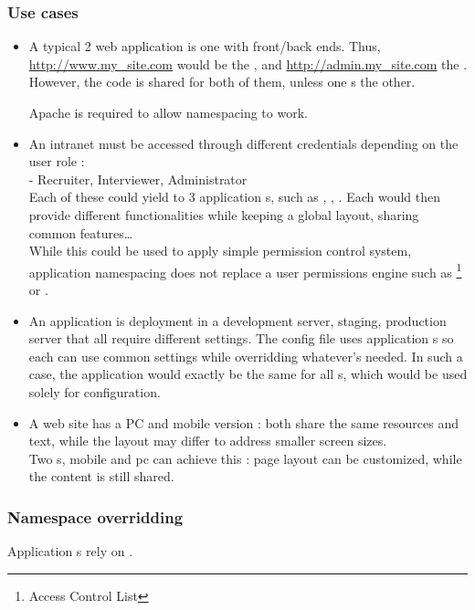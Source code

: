 \documentclass[pdftex,12pt,a4paper]{article}
\begin{document}
\subsubsection{Use cases}
    \begin{itemize}
        \item A typical 2  web application is one with front/back ends.
Thus, \url{http://www.my_site.com} would be the , and \url{http://admin.my_site.com} the .
However, the code is shared for both of them, unless one s the other.

\begin{note}
  Apache  is required to allow namespacing to work.
\end{note}
        \item An intranet must be accessed through different credentials depending on the user role : \\
            - Recruiter, Interviewer, Administrator \\
  Each of these could yield to 3 application s, such as , , .
  Each  would then provide different functionalities while keeping a global layout, sharing common features\ldots \\
    While this could be used to apply simple permission control system, application namespacing does not
    replace a user permissions engine such as \footnote{Access Control List} or .
        \item An application is deployment in a development server, staging, production server that all require different settings.
  The config file uses application s so each can use common settings while overridding whatever's needed.
  In such a case, the application would exactly be the same for all s, which would be used solely for configuration.
        \item A web site has a PC and mobile version : both share the same resources and text, while the layout may differ to
  address smaller screen sizes.\\
  Two s, mobile and pc can achieve this : page layout can be customized, while the content is still shared.
\end{itemize}

\subsubsection{Namespace overridding}
Application s rely on .
\end{document}

